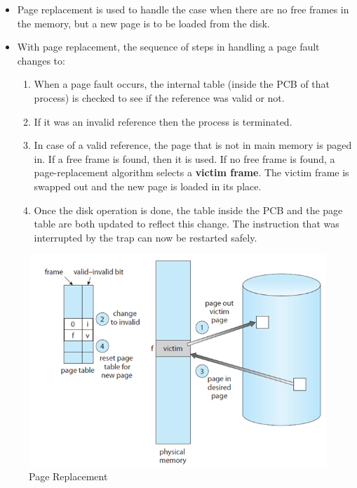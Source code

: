 \documentclass{article}
\theoremstyle{plain}
\theoremstyle{definition}
\begin{document}
\begin{itemize}
    \item Page replacement is used to handle the case when there are no free frames in the memory, but a new page is to be loaded from the disk. 
    
    \item With page replacement, the sequence of steps in handling a page fault changes to:
    \begin{enumerate}
        \item When a page fault occurs, the internal table (inside the PCB of that process) is checked to see if the reference was valid or not.
        
        \item If it was an invalid reference then the process is terminated.
        
        \item In case of a valid reference, the page that is not in main memory is paged in. If a free frame is found, then it is used. If no free frame is found, a page-replacement algorithm selects a \textbf{victim frame}. The victim frame is swapped out and the new page is loaded in its place.
        
        \item Once the disk operation is done, the table inside the PCB and the page table are both updated to reflect this change. The instruction that was interrupted by the trap can now be restarted safely. 
    \end{enumerate}
\end{itemize}

\begin{figure}[!h]
    \centering
    \includegraphics[scale=0.8]{os10.png}
    \caption{Page Replacement }
    \label{fig:my_label_10}
\end{figure}
\end{document}
